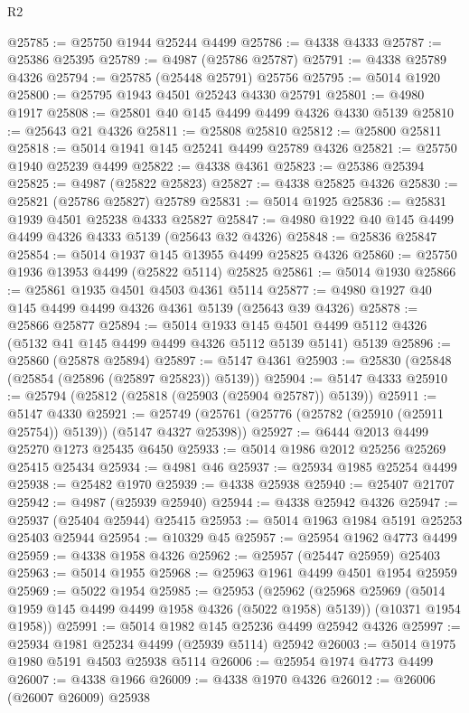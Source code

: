 \begin{lexlean}{R2}
\begin{coremodule}
@25785 := @25750 @1944 @25244 @4499
@25786 := @4338 @4333
@25787 := @25386 @25395
@25789 := @4987 (@25786 @25787)
@25791 := @4338 @25789 @4326
@25794 := @25785 (@25448 @25791) @25756
@25795 := @5014 @1920
@25800 := @25795 @1943 @4501 @25243 @4330 @25791
@25801 := @4980 @1917
@25808 := @25801 @40 @145 @4499 @4499 @4326 @4330 @5139
@25810 := @25643 @21 @4326
@25811 := @25808 @25810
@25812 := @25800 @25811
@25818 := @5014 @1941 @145 @25241 @4499 @25789 @4326
@25821 := @25750 @1940 @25239 @4499
@25822 := @4338 @4361
@25823 := @25386 @25394
@25825 := @4987 (@25822 @25823)
@25827 := @4338 @25825 @4326
@25830 := @25821 (@25786 @25827) @25789
@25831 := @5014 @1925
@25836 := @25831 @1939 @4501 @25238 @4333 @25827
@25847 := @4980 @1922 @40 @145 @4499 @4499 @4326 @4333 @5139 (@25643 @32 @4326)
@25848 := @25836 @25847
@25854 := @5014 @1937 @145 @13955 @4499 @25825 @4326
@25860 := @25750 @1936 @13953 @4499 (@25822 @5114) @25825
@25861 := @5014 @1930
@25866 := @25861 @1935 @4501 @4503 @4361 @5114
@25877 := @4980 @1927 @40 @145 @4499 @4499 @4326 @4361 @5139 (@25643 @39 @4326)
@25878 := @25866 @25877
@25894 := @5014
    @1933
    @145
    @4501
    @4499
    @5112
    @4326
    (@5132 @41 @145 @4499 @4499 @4326 @5112 @5139 @5141)
    @5139
@25896 := @25860 (@25878 @25894)
@25897 := @5147 @4361
@25903 := @25830 (@25848 (@25854 (@25896 (@25897 @25823)) @5139))
@25904 := @5147 @4333
@25910 := @25794 (@25812 (@25818 (@25903 (@25904 @25787)) @5139))
@25911 := @5147 @4330
@25921 := @25749 (@25761 (@25776 (@25782 (@25910 (@25911 @25754)) @5139)) (@5147 @4327 @25398))
@25927 := @6444 @2013 @4499 @25270 @1273 @25435 @6450
@25933 := @5014 @1986 @2012 @25256 @25269 @25415 @25434
@25934 := @4981 @46
@25937 := @25934 @1985 @25254 @4499
@25938 := @25482 @1970
@25939 := @4338 @25938
@25940 := @25407 @21707
@25942 := @4987 (@25939 @25940)
@25944 := @4338 @25942 @4326
@25947 := @25937 (@25404 @25944) @25415
@25953 := @5014 @1963 @1984 @5191 @25253 @25403 @25944
@25954 := @10329 @45
@25957 := @25954 @1962 @4773 @4499
@25959 := @4338 @1958 @4326
@25962 := @25957 (@25447 @25959) @25403
@25963 := @5014 @1955
@25968 := @25963 @1961 @4499 @4501 @1954 @25959
@25969 := @5022 @1954
@25985 := @25953
    (@25962
      (@25968 @25969 (@5014 @1959 @145 @4499 @4499 @1958 @4326 (@5022 @1958) @5139))
      (@10371 @1954 @1958))
@25991 := @5014 @1982 @145 @25236 @4499 @25942 @4326
@25997 := @25934 @1981 @25234 @4499 (@25939 @5114) @25942
@26003 := @5014 @1975 @1980 @5191 @4503 @25938 @5114
@26006 := @25954 @1974 @4773 @4499
@26007 := @4338 @1966
@26009 := @4338 @1970 @4326
@26012 := @26006 (@26007 @26009) @25938

\end{coremodule}
\end{lexlean}
